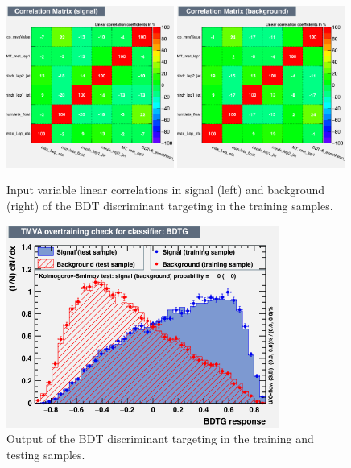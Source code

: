 \begin{figure}[hbtp]
 \begin{center}
   \includegraphics[width=0.49\textwidth]{ch8_figs/train_2lss_ttbar_bdtv8_value/CorrelationMatrixS.png}
   \includegraphics[width=0.49\textwidth]{ch8_figs/train_2lss_ttbar_bdtv8_value/CorrelationMatrixB.png}
   \caption[Input variable linear correlations of the BDT discriminant targeting \ttbar]{Input variable linear correlations in signal (left) and background (right)
     of the BDT discriminant targeting \ttbar in the training samples.}
   \label{fig:ttbarBdt_corrMatrix}
 \end{center}
\end{figure}

\begin{figure}[hbtp]
 \begin{center}
   \includegraphics[width=0.8\textwidth]{ch8_figs/train_2lss_ttbar_bdtv8_value/overtrain_BDTG.png}
   \caption[Output of the BDT discriminant targeting \ttbar]{Output of the BDT discriminant targeting \ttbar in the training and testing samples.}
   \label{fig:ttbarBdt_score}
 \end{center}
\end{figure}


